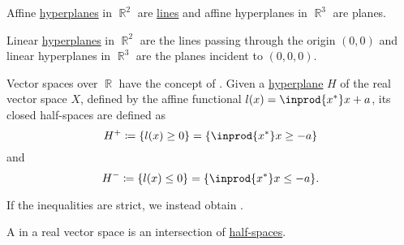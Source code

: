 \begin{example}\label{ex:hyperplanes}
  Affine \hyperref[def:hyperplane]{hyperplanes} in \( \BbbR^2 \) are \hyperref[def:geometric_line]{lines} and affine hyperplanes in \( \BbbR^3 \) are planes.

  Linear \hyperref[def:hyperplane]{hyperplanes} in \( \BbbR^2 \) are the lines passing through the origin \( (0, 0) \) and linear hyperplanes in \( \BbbR^3 \) are the planes incident to \( (0, 0, 0) \).
\end{example}

\begin{definition}\label{def:half_space}
  Vector spaces over \( \BbbR \) have the concept of . Given a \hyperref[def:hyperplane]{hyperplane} \( H \) of the real vector space \( X \), defined by the affine functional \( l(x) = \inprod {x^*} x + a \), its closed half-spaces are defined as
  \begin{equation*}
    H^+ \coloneqq \{ l(x) \geq 0 \} = \{ \inprod {x^*} x \geq -a \}
  \end{equation*}
  and
  \begin{equation*}
    H^- \coloneqq \{ l(x) \leq 0 \} = \{ \inprod {x^*} x \leq -a \}.
  \end{equation*}

  If the inequalities are strict, we instead obtain .
\end{definition}

\begin{definition}\label{def:polyhedron}
  A  in a real vector space is an intersection of \hyperref[def:half_space]{half-spaces}.
\end{definition}

